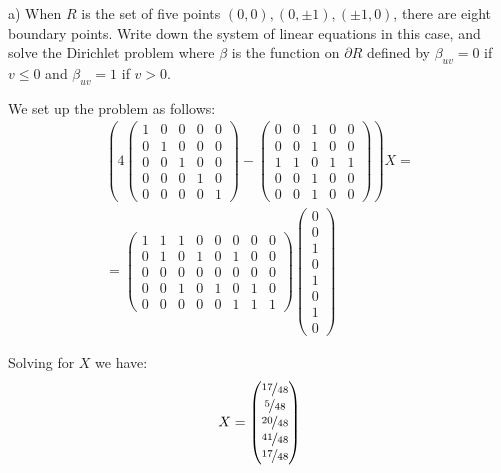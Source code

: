\documentclass{article}
\begin{document}
\begin{tcolorbox}
a) When $R$ is the set of five points $(0,0),(0,\pm 1), (\pm 1, 0)$, there are eight boundary points. Write down the system of linear equations in this case, and solve the Dirichlet problem where $\beta$ is the function on $\partial R$ defined by $\beta_{uv} = 0$ if $v \leq 0$ and $\beta_{uv} = 1$ if $v > 0$.
\end{tcolorbox}

We set up the problem as follows:
\begin{multline*}
    \left( 4
    \begin{pmatrix}
        1&  0&  0& 0&  0 \\
        0&  1&  0& 0&  0 \\
        0&  0&  1& 0&  0 \\
        0&  0&  0& 1&  0 \\
        0&  0&  0& 0&  1
    \end{pmatrix}
    -
    \begin{pmatrix}
        0&  0&  1& 0&  0 \\
        0&  0&  1& 0&  0 \\
        1&  1&  0& 1&  1 \\
        0&  0&  1& 0&  0 \\
        0&  0&  1& 0&  0
    \end{pmatrix}
    \right) X
    = \\ =
    \begin{pmatrix}
        1& 1& 1& 0& 0& 0& 0& 0 \\
        0& 1& 0& 1& 0& 1& 0& 0 \\
        0& 0& 0& 0& 0& 0& 0& 0 \\
        0& 0& 1& 0& 1& 0& 1& 0 \\
        0& 0& 0& 0& 0& 1& 1& 1
    \end{pmatrix}
    \begin{pmatrix}
        0\\
        0\\
        1\\
        0\\
        1\\
        0\\
        1\\
        0
    \end{pmatrix}
\end{multline*}

Solving for $X$ we have:
\[ X = 
    \begin{pmatrix}
        \nicefrac{17}{48} \\
        \nicefrac{5}{48} \\
        \nicefrac{20}{48} \\
        \nicefrac{41}{48} \\
        \nicefrac{17}{48}
    \end{pmatrix}
\]
\end{document}
